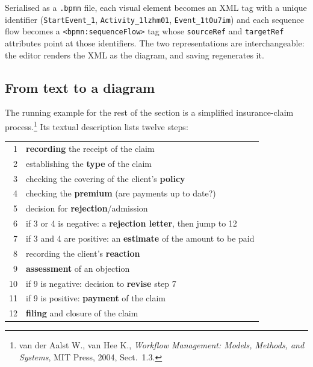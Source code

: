 \begin{center}
\end{center}

Serialised as a \texttt{.bpmn} file, each visual element becomes an XML tag with a unique identifier (\verb|StartEvent_1|, \verb|Activity_1lzhm01|, \verb|Event_1t0u7im|) and each sequence flow becomes a \verb|<bpmn:sequenceFlow>| tag whose \verb|sourceRef| and \verb|targetRef| attributes point at those identifiers. The two representations are interchangeable: the editor renders the XML as the diagram, and saving regenerates it.

\subsection{From text to a diagram}

The running example for the rest of the section is a simplified insurance-claim process.\footnote{van der Aalst W., van Hee K., \emph{Workflow Management: Models, Methods, and Systems}, MIT Press, 2004, Sect.~1.3.} Its textual description lists twelve steps:

\begin{center}
\footnotesize
\begin{tabular}{@{}rl@{}}
1  & \textbf{recording} the receipt of the claim \\
2  & establishing the \textbf{type} of the claim \\
3  & checking the covering of the client's \textbf{policy} \\
4  & checking the \textbf{premium} (are payments up to date?) \\
5  & decision for \textbf{rejection}/admission \\
6  & if 3 or 4 is negative: a \textbf{rejection letter}, then jump to 12 \\
7  & if 3 and 4 are positive: an \textbf{estimate} of the amount to be paid \\
8  & recording the client's \textbf{reaction} \\
9  & \textbf{assessment} of an objection \\
10 & if 9 is negative: decision to \textbf{revise} step 7 \\
11 & if 9 is positive: \textbf{payment} of the claim \\
12 & \textbf{filing} and closure of the claim \\
\end{tabular}
\end{center}

